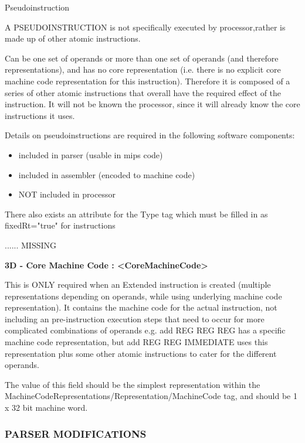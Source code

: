 \documentclass[12pt]{report}
\begin{document}
\begin{list}{Admissable Instruction Types}{}
\item[Pseudoinstruction]

A PSEUDOINSTRUCTION is not specifically executed by processor,rather is made up of other atomic instructions.

Can be one set of operands or more than one set of operands (and therefore representations), and has no core representation (i.e. there is no explicit core machine code representation for this instruction). Therefore it is composed of a series of other atomic instructions that overall have the required effect of the instruction. It will not be known the processor, since it will already know the core instructions it uses.

Details on pseudoinstructions are required in the following software components:
\begin{itemize}
\item included in parser (usable in mips code)
\item included in assembler (encoded to machine code)
\item NOT included in processor
\end{itemize}

There also exists an attribute for the Type tag which must be filled in as fixedRt="true" for instructions

...... MISSING

\end{list}

\textbf{3D - Core Machine Code : <CoreMachineCode> }

This is ONLY required when an Extended instruction is created (multiple representations depending on operands, while using underlying machine code representation). It contains the machine code for the actual instruction, not including an pre-instruction execution steps that need to occur for more complicated combinations of operands e.g. add REG REG REG has a specific machine code representation, but add REG REG IMMEDIATE uses this representation plus some other atomic instructions to cater for the different operands.

The value of this field should be the simplest representation within the MachineCodeRepresentations/Representation/MachineCode tag, and should be 1 x 32 bit machine word.

\subsubsection{PARSER MODIFICATIONS}
\end{document}
